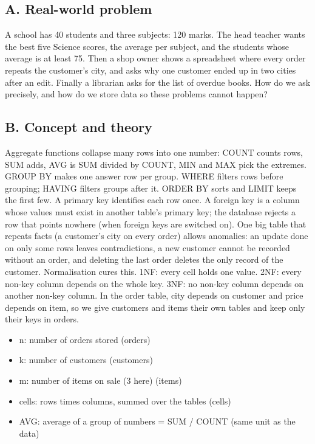 \documentclass[11pt,a4paper]{article}
\begin{document}
\subsection*{A. Real-world problem}
A school has 40 students and three subjects: 120 marks. The head teacher wants the best five Science scores, the average per subject, and the students whose average is at least 75. Then a shop owner shows a spreadsheet where every order repeats the customer's city, and asks why one customer ended up in two cities after an edit. Finally a librarian asks for the list of overdue books. How do we ask precisely, and how do we store data so these problems cannot happen?

\subsection*{B. Concept and theory}
Aggregate functions collapse many rows into one number: COUNT counts rows, SUM adds, AVG is SUM divided by COUNT, MIN and MAX pick the extremes. GROUP BY makes one answer row per group. WHERE filters rows before grouping; HAVING filters groups after it. ORDER BY sorts and LIMIT keeps the first few. A primary key identifies each row once. A foreign key is a column whose values must exist in another table's primary key; the database rejects a row that points nowhere (when foreign keys are switched on). One big table that repeats facts (a customer's city on every order) allows anomalies: an update done on only some rows leaves contradictions, a new customer cannot be recorded without an order, and deleting the last order deletes the only record of the customer. Normalisation cures this. 1NF: every cell holds one value. 2NF: every non-key column depends on the whole key. 3NF: no non-key column depends on another non-key column. In the order table, city depends on customer and price depends on item, so we give customers and items their own tables and keep only their keys in orders.

\begin{itemize}[nosep]
\item n: number of orders stored (orders)
\item k: number of customers (customers)
\item m: number of items on sale (3 here) (items)
\item cells: rows times columns, summed over the tables (cells)
\item AVG: average of a group of numbers = SUM / COUNT (same unit as the data)
\end{itemize}
\end{document}
